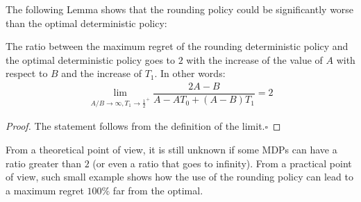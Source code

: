 The following Lemma shows that the rounding policy could be significantly worse than the optimal deterministic policy:

\begin{lemma}\label{lemma:gap2}
The ratio between the maximum regret of the rounding deterministic policy and the optimal deterministic policy goes to $2$ with the increase of the value of $A$ with respect to $B$ and the increase of $T_1$. In other words:  
\vspace{-0.2cm}
\begin{align*}
\lim_{A/B \rightarrow \infty, T_1 \rightarrow {\frac{1}{2}}^+} \dfrac{2A-B}{A- A T_0 +(A-B) T_1} = 2
\end{align*}
\end{lemma}
\begin{proof}
The statement follows from the definition of the limit.$\square$
\end{proof}


From a theoretical point of view, it is still unknown if some MDPs can have a ratio greater than $2$ (or even a ratio that goes to infinity). From a practical point of view, such small example shows how the use of the rounding policy can lead to a maximum regret  $100\%$ far from the optimal. 